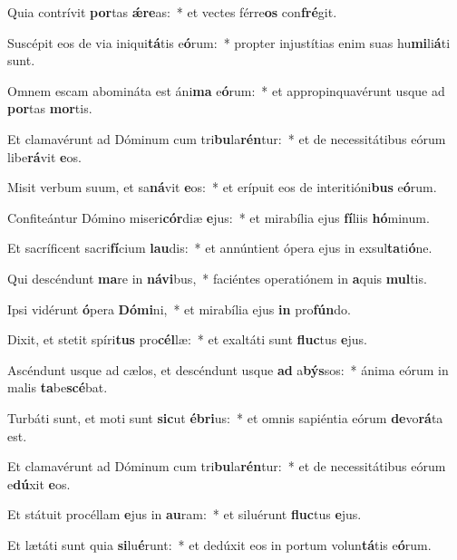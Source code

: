 \item Quia contrívit \textbf{por}tas \textbf{ǽ}\textbf{re}as:~* et vectes férre\textbf{os} con\textbf{fré}git.
\item Suscépit eos de via iniqui\textbf{tá}tis e\textbf{ó}rum:~* propter injustítias enim suas hu\textbf{mi}li\textbf{á}ti sunt.
\item Omnem escam abomináta est áni\textbf{ma} e\textbf{ó}rum:~* et appropinquavérunt usque ad \textbf{por}tas \textbf{mor}tis.
\item Et clamavérunt ad Dóminum cum tri\textbf{bu}la\textbf{rén}tur:~* et de necessitátibus eórum libe\textbf{rá}vit \textbf{e}os.
\item Misit verbum suum, et sa\textbf{ná}vit \textbf{e}os:~* et erípuit eos de interitióni\textbf{bus} e\textbf{ó}rum.
\item Confiteántur Dómino miseri\textbf{cór}diæ \textbf{e}jus:~* et mirabília ejus \textbf{fí}liis \textbf{hó}minum.
\item Et sacríficent sacri\textbf{fí}cium \textbf{lau}dis:~* et annúntient ópera ejus in exsul\textbf{ta}ti\textbf{ó}ne.
\item Qui descéndunt \textbf{ma}re in \textbf{ná}\textbf{vi}bus,~* faciéntes operatiónem in \textbf{a}quis \textbf{mul}tis.
\item Ipsi vidérunt \textbf{ó}pera \textbf{Dó}\textbf{mi}ni,~* et mirabília ejus \textbf{in} pro\textbf{fún}do.
\item Dixit, et stetit spíri\textbf{tus} pro\textbf{cél}læ:~* et exaltáti sunt \textbf{fluc}tus \textbf{e}jus.
\item Ascéndunt usque ad cælos, et descéndunt usque \textbf{ad} a\textbf{býs}sos:~* ánima eórum in malis \textbf{ta}be\textbf{scé}bat.
\item Turbáti sunt, et moti sunt \textbf{sic}ut \textbf{é}\textbf{bri}us:~* et omnis sapiéntia eórum \textbf{de}vo\textbf{rá}ta est.
\item Et clamavérunt ad Dóminum cum tri\textbf{bu}la\textbf{rén}tur:~* et de necessitátibus eórum e\textbf{dú}xit \textbf{e}os.
\item Et státuit procéllam \textbf{e}jus in \textbf{au}ram:~* et siluérunt \textbf{fluc}tus \textbf{e}jus.
\item Et lætáti sunt quia \textbf{si}lu\textbf{é}runt:~* et dedúxit eos in portum volun\textbf{tá}tis e\textbf{ó}rum.
